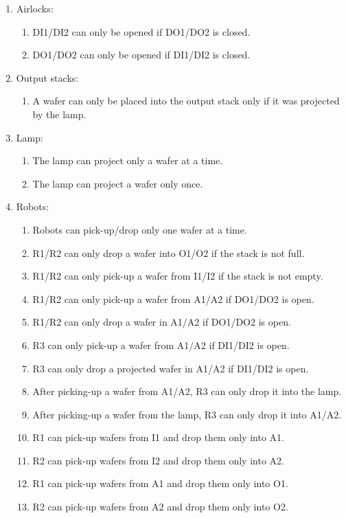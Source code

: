 \begin{enumerate}
\item Airlocks:
    \begin{enumerate}
    \item DI1/DI2 can only be opened if DO1/DO2 is closed.
    \item DO1/DO2 can only be opened if DI1/DI2 is closed.
    \end{enumerate}

\item Output stacks:
    \begin{enumerate}
    \item A wafer can only be placed into the output stack only if it was projected by the lamp.
    \end{enumerate}

\item Lamp:
    \begin{enumerate}
    \item The lamp can project only a wafer at a time.
    \item The lamp can project a wafer only once.
    \end{enumerate}
    
\item Robots:
    \begin{enumerate}
    \item Robots can pick-up/drop only one wafer at a time.
    \item R1/R2 can only drop a wafer into O1/O2 if the stack is not full.
    \item R1/R2 can only pick-up a wafer from I1/I2 if the stack is not empty.
    \item R1/R2 can only pick-up a wafer from A1/A2 if DO1/DO2 is open.
    \item R1/R2 can only drop a wafer in A1/A2 if DO1/DO2 is open.
    \item R3 can only pick-up a wafer from A1/A2 if DI1/DI2 is open.
    \item R3 can only drop a projected wafer in A1/A2 if DI1/DI2 is open.
    \item After picking-up a wafer from A1/A2, R3 can only drop it into the lamp.
    \item After picking-up a wafer from the lamp, R3 can only drop it into A1/A2.
    \item R1 can pick-up wafers from I1 and drop them only into A1.
    \item R2 can pick-up wafers from I2 and drop them only into A2.
    \item R1 can pick-up wafers from A1 and drop them only into O1.
    \item R2 can pick-up wafers from A2 and drop them only into O2.
    \end{enumerate}
\end{enumerate}


